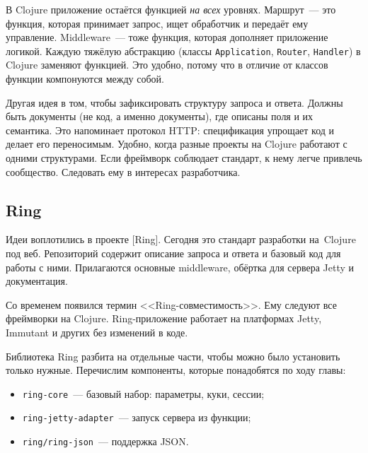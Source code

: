 \label{http-all-function}

В Clojure приложение остаётся функцией \emph{на всех} уровнях. Маршрут~--- это
функция, которая принимает запрос, ищет обработчик и передаёт ему
управление. Middleware~--- тоже функция, которая дополняет приложение
логикой. Каждую тяжёлую абстракцию (классы \verb|Application|, \verb|Router|,
\verb|Handler|) в Clojure заменяют функцией. Это удобно, потому что в отличие от
классов функции компонуются между собой.

Другая идея в том, чтобы зафиксировать структуру запроса и ответа. Должны быть
документы (не код, а именно документы), где описаны поля и их семантика. Это
напоминает протокол HTTP: спецификация упрощает код и делает его
переносимым. Удобно, когда разные проекты на Clojure работают с одними
структурами. Если фреймворк соблюдает стандарт, к нему легче привлечь
сообщество. Следовать ему в интересах разработчика.

\subsection{Ring}

\label{ring-jetty}

Идеи воплотились в проекте [Ring].
Сегодня это стандарт разработки на~Clojure под веб. Репозиторий содержит описание
запроса и ответа и базовый код для работы с ними. Прилагаются основные middleware,
обёртка для сервера Jetty и документация.


Со временем появился термин <<Ring-совмести\-мость>>. Ему следуют все фреймворки
на Clojure. Ring-приложение работает на платформах Jetty, Immutant и других без
изменений в коде.

Библиотека Ring разбита на отдельные части, чтобы можно было установить только
нужные. Перечислим компоненты, которые понадобятся по ходу главы:

\begin{itemize}

\item
  \verb|ring-core|~--- базовый набор: параметры, куки, сессии;

\item
  \verb|ring-jetty-adapter|~--- запуск сервера из функции;

\item
  \verb|ring/ring-json|~--- поддержка JSON.

\end{itemize}

